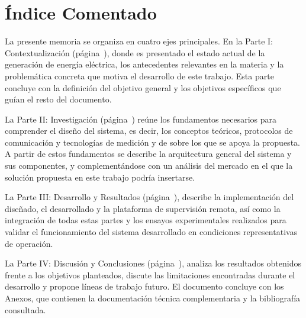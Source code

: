 \chapter*{Índice Comentado} 

La presente memoria se organiza en cuatro ejes principales. En la Parte I: Contextualización (página~\pageref{part:contexto}), donde es presentado el estado actual de la generación de energía eléctrica, los antecedentes relevantes en la materia y la problemática concreta que motiva el desarrollo de este trabajo. Esta parte concluye con la definición del objetivo general y los objetivos específicos que guían el resto del documento.

La Parte II: Investigación (página~\pageref{part:investigacion}) reúne los fundamentos necesarios para comprender el diseño del sistema, es decir, los conceptos teóricos, protocolos de comunicación y tecnologías de medición y de  sobre los que se apoya la propuesta. A partir de estos fundamentos se describe la arquitectura general del sistema y sus componentes, y complementándose con un análisis del mercado en el que la solución propuesta en este trabajo podría insertarse.

La Parte III: Desarrollo y Resultados (página~\pageref{part:desarrollo}), describe la implementación del  diseñado, el  desarrollado y la plataforma de supervisión remota, así como la integración de todas estas partes y los ensayos experimentales realizados para validar el funcionamiento del sistema desarrollado en condiciones representativas de operación.

La Parte IV: Discusión y Conclusiones (página~\pageref{part:conclusiones}), analiza los resultados obtenidos frente a los objetivos planteados, discute las limitaciones encontradas durante el desarrollo y propone líneas de trabajo futuro. El documento concluye con los Anexos, que contienen la documentación técnica complementaria y la bibliografía consultada.
